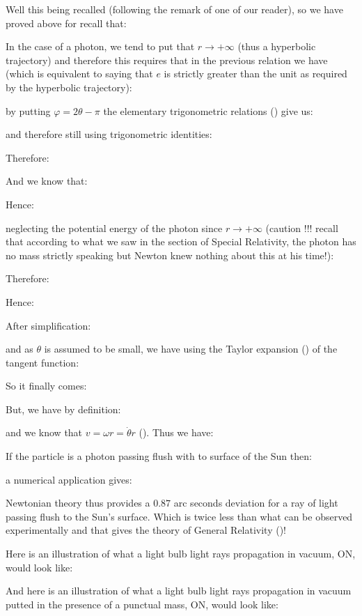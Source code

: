	Well this being recalled (following the remark of one of our reader), so we have proved above for recall that:
	
	In the case of a photon, we tend to put that $r\rightarrow +\infty$ (thus a hyperbolic trajectory) and therefore this requires that in the previous relation we have (which is equivalent to saying that $e$ is strictly greater than the unit as required by the hyperbolic trajectory):
	
	by putting $\varphi=2\theta-\pi$ the elementary trigonometric relations () give us:
	
	and therefore still using trigonometric identities:
	
	Therefore:
	
	And we know that:
	
	Hence:
	
	neglecting the potential energy of the photon since $r\rightarrow +\infty$ (caution !!! recall that according to what we saw in the section of Special Relativity, the photon has no mass strictly speaking but Newton knew nothing about this at his time!):
	
	Therefore:
	
	Hence:
	
	After simplification:
	
	and as $\theta$ is assumed to be small, we have using the Taylor expansion () of the tangent function:
	
	So it finally comes:
	
	But, we have by definition:
	
	and we know that $v=\omega r=\dot{\theta}r$ (). Thus we have:
	
	If the particle is a photon passing flush with to surface of the Sun then:
	
	a numerical application gives:
	
	Newtonian theory thus provides a $0.87$ arc seconds deviation for a ray of light passing flush to the Sun's surface. Which is twice less than what can be observed experimentally and that gives the theory of General Relativity ()!
	
	Here is an illustration of what a light bulb light rays propagation in vacuum, ON, would look like:
	\begin{center}
	\centering
	\end{center}
	And here is an illustration of what a light bulb light rays propagation in vacuum putted in the presence of a punctual mass, ON, would look like:
	\begin{center}
	\centering
	\end{center}
	
